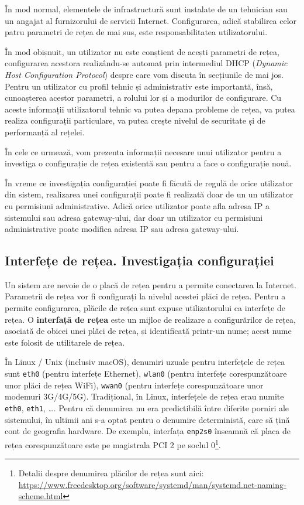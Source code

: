 În mod normal, elementele de infrastructură sunt instalate de un tehnician sau un angajat al furnizorului de servicii Internet.
Configurarea, adică stabilirea celor patru parametri de rețea de mai sus, este responsabilitatea utilizatorului.

În mod obișnuit, un utilizator nu este conștient de acești parametri de rețea, configurarea acestora realizându-se automat prin intermediul DHCP (\textit{Dynamic Host Configuration Protocol}) despre care vom discuta în secțiunile de mai jos.
Pentru un utilizator cu profil tehnic și administrativ este importantă, însă, cunoașterea acestor parametri, a rolului lor și a modurilor de configurare.
Cu aceste informații utilizatorul tehnic va putea depana probleme de rețea, va putea realiza configurații particulare, va putea crește nivelul de securitate și de performanță al rețelei.

În cele ce urmează, vom prezenta informații necesare unui utilizator pentru a investiga o configurație de rețea existentă sau pentru a face o configurație nouă.

În vreme ce investigația configurației poate fi făcută de regulă de orice utilizator din sistem, realizarea unei configurații poate fi realizată doar de un un utilizator cu permisiuni administrative.
Adică orice utilizator poate afla adresa IP a sistemului sau adresa gateway-ului, dar doar un utilizator cu permisiuni administrative poate modifica adresa IP sau adresa gateway-ului.

\subsection{Interfețe de rețea. Investigația configurației}
\label{sec:net:config:interface}

Un sistem are nevoie de o placă de rețea pentru a permite conectarea la Internet.
Parametrii de rețea vor fi configurați la nivelul acestei plăci de rețea.
Pentru a permite configurarea, plăcile de rețea sunt expuse utilizatorului ca interfețe de rețea.
O \textbf{interfață de rețea} este un mijloc de realizare a configurărilor de rețea, asociată de obicei unei plăci de rețea, și identificată printr-un nume;
acest nume este folosit de utilitarele de rețea.

În Linux / Unix (inclusiv macOS), denumiri uzuale pentru interfețele de rețea sunt \texttt{eth0} (pentru interfețe Ethernet), \texttt{wlan0} (pentru interfețe corespunzătoare unor plăci de rețea WiFi), \texttt{wwan0} (pentru interfețe corespunzătoare unor modemuri 3G/4G/5G).
Tradițional, în Linux, interfețele de rețea erau numite \texttt{eth0}, \texttt{eth1}, \ldots.
Pentru că denumirea nu era predictibilă între diferite porniri ale sistemului, în ultimii ani s-a optat pentru o denumire deterministă, care să țină cont de geografia hardware.
De exemplu, interfața \texttt{enp2s0} înseamnă că placa de rețea corespunzătoare este pe magistrala PCI 2 pe soclul 0\footnote{Detalii despre denumirea plăcilor de rețea sunt aici: \url{https://www.freedesktop.org/software/systemd/man/systemd.net-naming-scheme.html}}.

